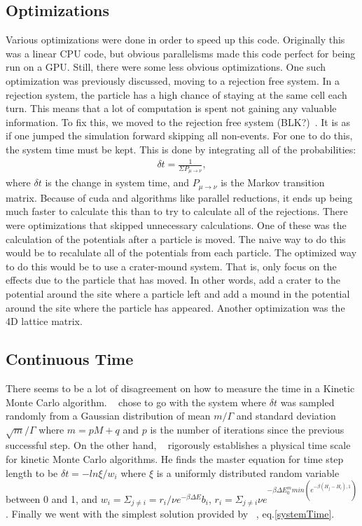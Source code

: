 \subsection{Optimizations}
Various optimizations were done in order to speed up this code. Originally this was a linear CPU code, but obvious parallelisms made this code perfect for being run on a GPU. Still, there were some less obvious optimizations. One such optimization was previously discussed, moving to a rejection free system. In a rejection system, the particle has a high chance of staying at the same cell each turn. This means that a lot of computation is spent not gaining any valuable information. To fix this, we moved to the rejection free system (BLK?)~\cite{Newman99}. It is as if one jumped the simulation forward skipping all non-events. For one to do this, the system time must be kept. This is done by integrating all of the probabilities:
\begin{eqnarray}
\delta t = \frac {1} {\Sigma P_{\mu \rightarrow \nu}},
\label{systemTime}
\end{eqnarray}
where $\delta t$ is the change in system time, and $P_{\mu \rightarrow \nu}$ is the Markov transition matrix. Because of {\sc cuda} and algorithms like parallel reductions, it ends up being much faster to calculate this than to try to calculate all of the rejections. There were optimizations that skipped unnecessary calculations. One of these was the calculation of the potentials after a particle is moved. The naive way to do this would be to recalulate all of the potentials from each particle. The optimized way to do this would be to use a crater-mound system. That is, only focus on the effects due to the particle that has moved. In other words, add a crater to the potential around the site where a particle left and add a mound in the potential around the site where the particle has appeared. Another optimization was the 4D lattice matrix.

\subsection{Continuous Time}
There seems to be a lot of disagreement on how to measure the time in a Kinetic Monte Carlo algorithm. ~\cite{Ferrero14} chose to go with the system where $\delta t$ was sampled randomly from a Gaussian distribution of mean $m/ \Gamma$ and standard deviation $\sqrt{m}/\Gamma$ where $m = p M + q$ and $p$ is the number of iterations since the previous successful step. On the other hand, ~\cite{Serebrinsky11} rigorously establishes a physical time scale for kinetic Monte Carlo algorithms. He finds the master equation for time step length to be $\delta t = -ln{\xi} / w_i$ where $\xi$ is a uniformly distributed random variable between 0 and 1, and $w_i = \Sigma_{j \neq i} = r_i / \nu e^{-\beta \Delta E} b_i$, $r_i = \Sigma_{j \neq i} \nu e^{-\beta \Delta E^m_0 min(e^{-\beta (H_j - H_i ),1 })}$. Finally we went with the simplest solution provided by ~\cite{Newman99}, eq.\ref{systemTime}. 
  


